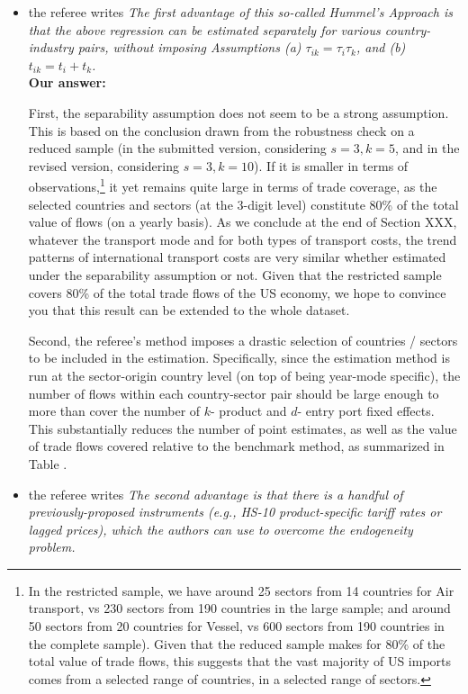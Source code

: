 \documentclass[a4paper,12pt]{article}
\begin{document}
\begin{itemize}
\item the referee writes \textit{The first advantage of this so-called Hummel's Approach is that the above
regression can be estimated separately for various country-industry pairs, without
imposing Assumptions (a) $\tau_{ik} = \tau_i\tau_{k}$, and (b) $t_{ik} = t_i+ t_{k}$.} \\

\textbf{Our answer:}

First, the separability assumption does not seem to be a strong assumption. This is based on the conclusion drawn from the robustness check on a reduced sample (in the submitted version, considering $s=3, k=5$, and in the revised version, considering $s=3, k=10$). If it is smaller in terms of observations,\footnote{In the restricted sample, we have around 25 sectors from 14 countries for Air transport, vs 230 sectors from 190 countries in the large sample; and around 50 sectors from 20 countries for Vessel, vs 600 sectors from 190 countries in the complete sample). Given that the reduced sample makes for 80\% of the total value of trade flows, this suggests that the vast majority of US imports comes from a selected range of countries, in a selected range of sectors.} it yet remains quite large in terms of trade coverage, as the selected countries and sectors (at the 3-digit level) constitute 80\% of the total value of flows (on a yearly basis). As we conclude at the end of Section XXX, whatever the transport mode and for both types of transport costs, the trend patterns of international transport costs are very similar whether estimated under the separability assumption or not. Given that the restricted sample covers 80\% of the total trade flows of the US economy, we hope to convince you that this result can be extended to the whole dataset.


Second, the referee's method imposes a drastic selection of countries / sectors to be included in the estimation. Specifically, since the estimation method is run at the sector-origin country level (on top of being year-mode specific), the number of flows within each country-sector pair should be large enough to more than cover the number of $k$- product and $d$- entry port fixed effects. This substantially reduces the number of point estimates, as well as the value of trade flows covered relative to the  benchmark method, as summarized in Table .



\item the referee writes \textit{The second advantage is that there is a handful of previously-proposed instruments (e.g., HS-10 product-specific tariff rates or lagged prices), which the authors can use to overcome the endogeneity problem.} \\


\end{itemize}
\end{document}
